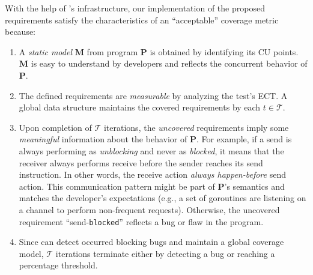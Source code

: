 %
With the help of \goat's infrastructure, our implementation of the proposed requirements satisfy the characteristics of an ``acceptable'' coverage metric because:
\begin{enumerate}
  \item A \textit{static model} \textbf{M} from program \textbf{P} is obtained by identifying its CU points. \textbf{M} is easy to understand by developers and reflects the concurrent behavior of \textbf{P}.
  \item The defined requirements are \textit{measurable} by analyzing the test's ECT. A global data structure maintains the covered requirements by each $t \in \mathcal{T}$.
  \item Upon completion of $\mathcal{T}$ iterations, the \textit{uncovered} requirements imply some \textit{meaningful} information about the behavior of \textbf{P}. For example, if a send is always performing as \textit{unblocking} and never as \textit{blocked}, it means that the receiver always performs receive before the sender reaches its send instruction. In other words, the receive action \textit{always happen-before} send action. This communication pattern might be part of \textbf{P}'s semantics and matches the developer's expectations (e.g., a set of goroutines are listening on a channel to perform non-frequent requests). Otherwise, the uncovered requirement  ``send-\texttt{blocked}'' reflects a bug or flaw in the program.
  \item Since \goat can detect occurred blocking bugs and maintain a global coverage model, $\mathcal{T}$ iterations terminate either by detecting a bug or reaching a percentage threshold.
\end{enumerate}

